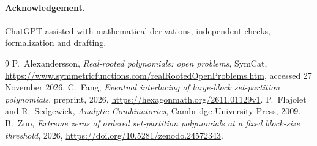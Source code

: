 \documentclass[11pt]{article}
\begin{document}
\paragraph{Acknowledgement.}
ChatGPT assisted with mathematical derivations, independent checks, formalization and drafting.

\begin{thebibliography}{9}
 P.~Alexandersson, \emph{Real-rooted polynomials: open problems}, SymCat, \url{https://www.symmetricfunctions.com/realRootedOpenProblems.htm}, accessed 27 November 2026.
 C.~Fang, \emph{Eventual interlacing of large-block set-partition polynomials}, preprint, 2026, \url{https://hexagonmath.org/2611.01129v1}.
 P.~Flajolet and R.~Sedgewick, \emph{Analytic Combinatorics}, Cambridge University Press, 2009.
 B.~Zuo, \emph{Extreme zeros of ordered set-partition polynomials at a fixed block-size threshold}, 2026, \url{https://doi.org/10.5281/zenodo.24572343}.
\end{thebibliography}
\end{document}
